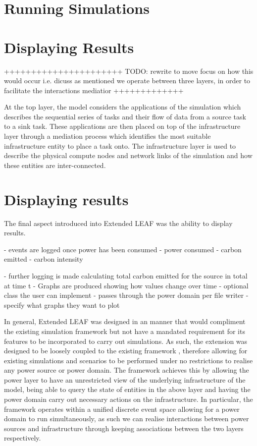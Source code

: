 \documentclass{l4proj}
\begin{document}
\section{Running Simulations}\label{imp:sec:running-simulations}

\section{Displaying Results}\label{sec:displaying-results}

++++++++++++++++++++++
TODO: rewrite to move focus on how this would occur i.e. dicuss as mentioned we operate between three layers, in order to facilitate the interactions mediatior
+++++++++++++

At the top layer, the model considers the applications of the simulation which describes the sequential series of tasks and their flow of data from a source task to a sink task.
These applications are then placed on top of the infrastructure layer through a mediation process which identifies the most suitable infrastructure entity to place a task onto.
The infrastructure layer is used to describe the physical compute nodes and network links of the simulation and how these entities are inter-connected.


\section{Displaying results}\label{subsec:displaying-results}


The final aspect introduced into Extended LEAF was the ability to display results.


- events are logged once power has been consumed
- power consumed
- carbon emitted
- carbon intensity

- further logging is made calculating total carbon emitted for the source in total at time t
- Graphs are produced showing how values change over time
- optional class the user can implement
- passes through the power domain per file writer
- specify what graphs they want to plot

In general, Extended LEAF was designed in an manner that would compliment the existing simulation framework but not have a mandated requirement for its features to be incorporated to carry out simulations.
As such, the extension was designed to be loosely coupled to the existing framework \citep{looseCoupling}, therefore allowing for existing simulations and scenarios to be performed under no restrictions to realise any power source or power domain.
The framework achieves this by allowing the power layer to have an unrestricted view of the underlying infrastructure of the model, being able to query the state of entities in the above layer and having the power domain carry out necessary actions on the infrastructure.
In particular, the framework operates within a unified discrete event space allowing for a power domain to run simultaneously, as such we can realise interactions between power sources and infrastructure through keeping associations between the two layers respectively.
\end{document}
